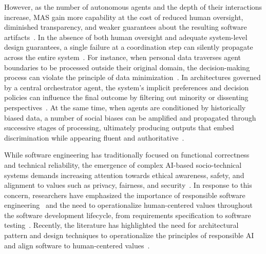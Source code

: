 \documentclass[sigconf,nonacm]{acmart}
\begin{document}
However, as the number of autonomous agents and the depth of their interactions increase, MAS gain more capability at the cost of reduced human oversight, diminished transparency, and weaker guarantees about the resulting software artifacts~\cite{chan2023harms}.
In the absence of both human oversight and adequate system-level design guarantees, a single failure at a coordination step can silently propagate across the entire system~\cite{greshake2023not}.
For instance, when personal data traverses agent boundaries to be processed outside their original domain, the decision-making process can violate the principle of data minimization~\cite{li2025123}.
In architectures governed by a central orchestrator agent, the system’s implicit preferences and decision policies can influence the final outcome by filtering out minority or dissenting perspectives~\cite{ashkinaze2025plurals,feng2024modular}.
At the same time, when agents are conditioned by historically biased data, a number of social biases can be amplified and propagated through successive stages of processing, ultimately producing outputs that embed discrimination while appearing fluent and authoritative~\cite{nguyen2025social,yu2025netsafe}.

While software engineering has traditionally focused on functional correctness and technical reliability, the emergence of complex AI-based socio-technical systems demands increasing attention towards ethical awareness, safety, and alignment to values such as privacy, fairness, and security~\cite{stahl2024ethicsa,lu2022roadmap}.
In response to this concern, researchers have emphasized the importance of responsible software engineering~\cite{schieferdecker2020responsible,bennaceur2024responsible} and the need to operationalize human-centered values throughout the software development lifecycle, from requirements specification to software testing~\cite{shahin2022operationalizing,mougouei2018operationalizing}.
Recently, the literature has highlighted the need for architectural pattern and design techniques to operationalize the principles of responsible AI and align software to human-centered values~\cite{lu2022roadmap}.
\end{document}
